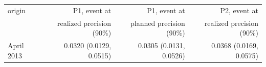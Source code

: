 \begin{tabular}{lrrr}
\toprule
origin & P1, event at & P1, event at & P2, event at \\
 & realized precision (90\%) & planned precision (90\%) & realized precision (90\%) \\
\midrule
April 2013 & 0.0320 (0.0129, 0.0515) & 0.0305 (0.0131, 0.0526) & 0.0368 (0.0169, 0.0575) \\

\end{tabular}

